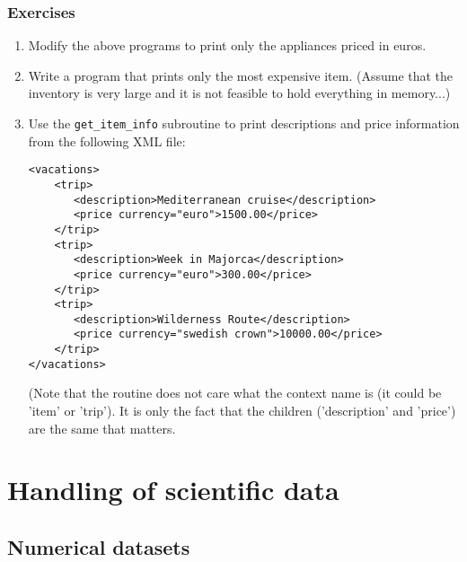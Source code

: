 \documentclass[11pt]{article}
\begin{document}
\subsubsection{Exercises}
\begin{enumerate}
\item Modify the above programs to print only the appliances priced in
euros.
\item Write a program that prints only the most expensive
item. (Assume that the inventory is very large and it is not feasible
to hold everything in memory...)
\item Use the \texttt{get\_item\_info} subroutine to print
descriptions and price information from the following XML file:
%
\begin{verbatim}
<vacations>
	<trip>                                                
	   <description>Mediterranean cruise</description>  
	   <price currency="euro">1500.00</price>  
	</trip>                                                            
	<trip>                                                
	   <description>Week in Majorca</description>  
	   <price currency="euro">300.00</price>  
	</trip>                    
	<trip>                                                
	   <description>Wilderness Route</description>  
	   <price currency="swedish crown">10000.00</price>  
	</trip>    
</vacations>                                          
\end{verbatim}
%
(Note that the routine does not care what the context name is (it
could be 'item' or 'trip'). It is only the fact that the children
('description' and 'price') are the same that matters.
\end{enumerate}

\section{Handling of scientific data}

\subsection{Numerical datasets}
\end{document}
